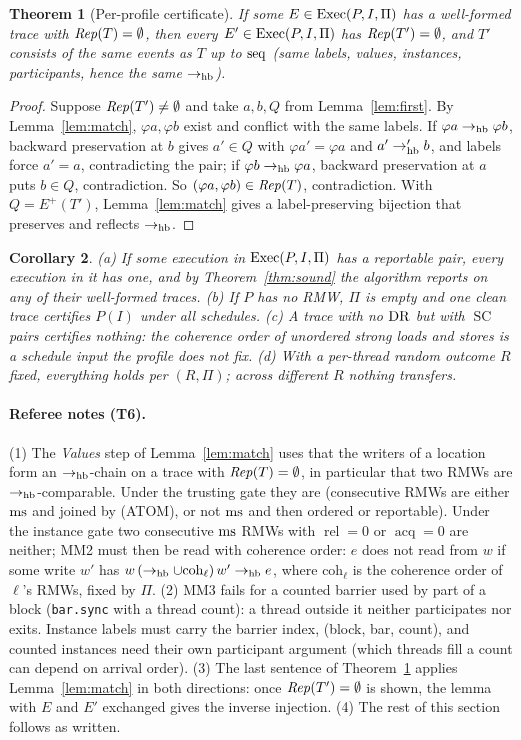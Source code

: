 \documentclass[11pt]{article}
\newtheorem{theorem}{Theorem}
\newtheorem{corollary}[theorem]{Corollary}
\theoremstyle{remark}
\DeclareMathOperator{\rel}{rel}\DeclareMathOperator{\acq}{acq}\DeclareMathOperator{\key}{key}
\DeclareMathOperator{\SC}{SC}
\newcommand{\Eplus}{E^{+}}\newcommand{\Fr}{\mathcal{F}}\newcommand{\Pred}{\mathcal{P}}
\begin{document}
\begin{theorem}[Per-profile certificate]\label{thm:cert}
If some $E\in\operatorname{Exec}(P,I,\Pi)$ has a well-formed trace with $\mathit{Rep}(T)=\emptyset$, then every
$E'\in\operatorname{Exec}(P,I,\Pi)$ has $\mathit{Rep}(T')=\emptyset$, and $T'$ consists of the same events as $T$
up to $\operatorname{seq}$ (same labels, values, instances, participants, hence the same $\to_{\mathrm{hb}}$).
\end{theorem}
\begin{proof}
Suppose $\mathit{Rep}(T')\ne\emptyset$ and take $a,b,Q$ from Lemma~\ref{lem:first}. By
Lemma~\ref{lem:match}, $\varphi a,\varphi b$ exist and conflict with the same labels. If
$\varphi a\to_{\mathrm{hb}}\varphi b$, backward preservation at $b$ gives $a'\in Q$ with $\varphi a'=\varphi a$
and $a'\to_{\mathrm{hb}}' b$, and labels force $a'=a$, contradicting the pair; if $\varphi b\to_{\mathrm{hb}}\varphi a$,
backward preservation at $a$ puts $b\in Q$, contradiction. So $(\varphi a,\varphi b)\in\mathit{Rep}(T)$,
contradiction. With $Q=\Eplus(T')$, Lemma~\ref{lem:match} gives a label-preserving
bijection that preserves and reflects $\to_{\mathrm{hb}}$.
\end{proof}

\begin{corollary}\label{cor:causal}
(a) If some execution in $\operatorname{Exec}(P,I,\Pi)$ has a reportable pair, every execution in it has
one, and by Theorem~\ref{thm:sound} the algorithm reports on any of their well-formed
traces. (b) If $P$ has no RMW, $\Pi$ is empty and one clean trace certifies $P(I)$ under all
schedules. (c) A trace with no $\operatorname{DR}$ but with $\SC$ pairs certifies nothing: the coherence
order of unordered strong loads and stores is a schedule input the profile does not fix.
(d) With a per-thread random outcome $R$ fixed, everything holds per $(R,\Pi)$; across
different $R$ nothing transfers.
\end{corollary}

\paragraph{Referee notes (T6).} (1) The \emph{Values} step of Lemma~\ref{lem:match} uses that
the writers of a location form an $\to_{\mathrm{hb}}$-chain on a trace with $\mathit{Rep}(T)=\emptyset$, in
particular that two RMWs are $\to_{\mathrm{hb}}$-comparable. Under the trusting gate they are (consecutive
RMWs are either $\operatorname{ms}$ and joined by (ATOM), or not $\operatorname{ms}$ and then ordered or reportable).
Under the instance gate two consecutive $\operatorname{ms}$ RMWs with $\rel=0$ or $\acq=0$ are neither;
MM2 must then be read with coherence order: $e$ does not read from $w$ if some write $w'$
has $w\,(\to_{\mathrm{hb}}\cup\mathrm{coh}_\ell)\,w'\to_{\mathrm{hb}} e$, where $\mathrm{coh}_\ell$ is the coherence order of $\ell$'s RMWs,
fixed by $\Pi$. (2) MM3 fails for a counted barrier used by part of a block
(\texttt{bar.sync} with a thread count): a thread outside it neither participates nor
exits. Instance labels must carry the barrier index, (block, bar, count), and counted
instances need their own participant argument (which threads fill a count can depend on
arrival order). (3) The last sentence of Theorem~\ref{thm:cert} applies
Lemma~\ref{lem:match} in both directions: once $\mathit{Rep}(T')=\emptyset$ is shown, the lemma with
$E$ and $E'$ exchanged gives the inverse injection. (4) The rest of this section follows as
written.
\end{document}
